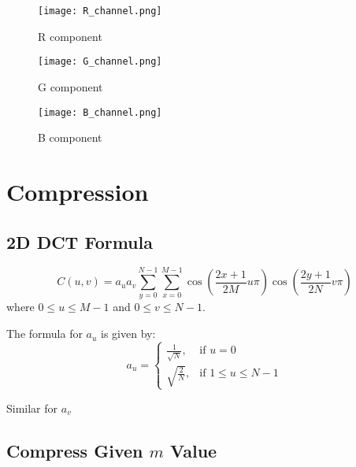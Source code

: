 \documentclass{report}
\begin{document}
\newpage

\begin{figure}[h]
    \centering
    \texttt{[image: R\_channel.png]}
    \caption{R component}
    \label{fig:R-channel}
\end{figure}

\begin{figure}[h]
    \centering
    \texttt{[image: G\_channel.png]}
    \caption{G component}
    \label{fig:G-channel}
\end{figure}

\begin{figure}[h]
    \centering
    \texttt{[image: B\_channel.png]}
    \caption{B component}
    \label{fig:B-channel}
\end{figure}

\newpage

\chapter{Compression}
\section{2D DCT Formula}
\begin{equation}
\label{eq:2d-dct}
C(u,v) = a_u a_v \sum_{y=0}^{N-1} \sum_{x=0}^{M-1} \cos \left( \frac{2x+1}{2M} u\pi \right) \cos \left( \frac{2y+1}{2N} v\pi \right)
\end{equation}
\hspace{6cm}where $0 \leq u \leq M - 1$ and $0 \leq v \leq N - 1$.

\vspace{0.5cm}
The formula for \( a_u \) is given by:
\begin{equation}
a_u = 
\begin{cases}
\frac{1}{\sqrt{N}}, & \text{if } u = 0 \\
\sqrt{\frac{2}{N}}, & \text{if } 1 \leq u \leq N - 1
\end{cases}
\end{equation}

\vspace{0.5cm}
Similar for  $ a_v$

\section{Compress Given $m$ Value}
\end{document}
